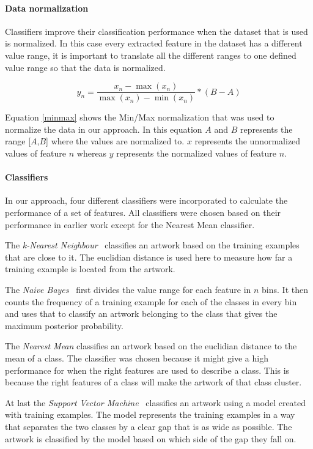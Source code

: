 \paragraph{Data normalization}

Classifiers improve their classification performance when the dataset that is used is normalized.
In this case every extracted feature in the dataset has a different value range, it is important to translate all the different ranges to one defined value range so that the data is normalized.

\begin{equation}
\label{minmax}
y_n=\frac{x_n - \max(x_n)}{\max(x_n)-\min(x_n)} * (B-A)
\end{equation}

Equation \ref{minmax} shows the Min/Max normalization that was used to normalize the data in our approach.
In this equation $A$ and $B$ represents the range [$A$,$B$] where the values are normalized to.
$x$ represents the unnormalized values of feature $n$ whereas $y$ represents the normalized values of feature $n$.

\paragraph{Classifiers}
In our approach, four different classifiers were incorporated to calculate the performance of a set of features.
All classifiers were chosen based on their performance in earlier work except for the Nearest Mean classifier.

The \textit{k-Nearest Neighbour}~\cite{korn1996fast} classifies an artwork based on the training examples that are close to it.
The euclidian distance is used here to measure how far a training example is located from the artwork.

The \textit{Naive Bayes}~\cite{keren2003recognizing} first divides the value range for each feature in $n$ bins.
It then counts the frequency of a training example for each of the classes in every bin and uses that to classify an artwork belonging to the class that gives the maximum posterior probability.

The \textit{Nearest Mean} classifies an artwork based on the euclidian distance to the mean of a class.
The classifier was chosen because it might give a high performance for when the right features are used to describe a class.
This is because the right features of a class will make the artwork of that class cluster.

At last the \textit{Support Vector Machine}~\cite{chapelle1999svms} classifies an artwork using a model created with training examples.
The model represents the training examples in a way that separates the two classes by a clear gap that is as wide as possible.
The artwork is classified by the model based on which side of the gap they fall on.

